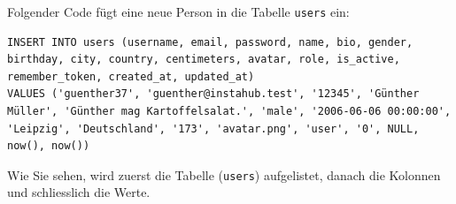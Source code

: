 \begin{myexample}
\label{ex:sql-insert}
Folgender Code fügt eine neue Person in die Tabelle \texttt{users} ein:
\begin{lstlisting}[style=sql]
INSERT INTO users (username, email, password, name, bio, gender, birthday, city, country, centimeters, avatar, role, is_active, remember_token, created_at, updated_at) 
VALUES ('guenther37', 'guenther@instahub.test', '12345', 'Günther Müller', 'Günther mag Kartoffelsalat.', 'male', '2006-06-06 00:00:00', 'Leipzig', 'Deutschland', '173', 'avatar.png', 'user', '0', NULL, now(), now())
\end{lstlisting}
Wie Sie sehen, wird zuerst die Tabelle (\texttt{users}) aufgelistet, danach die Kolonnen und schliesslich die Werte.
\end{myexample}

